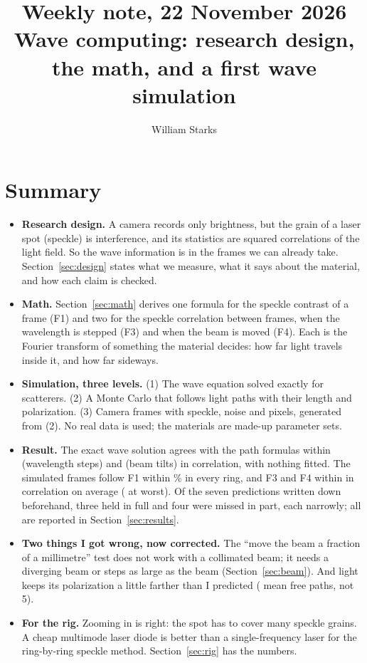 \documentclass[11pt]{article}
\title{Weekly note, 22 November 2026\\[2pt]\large Wave computing: research design, the math, and a first wave simulation}
\author{William Starks}
\date{}
\begin{document}
\maketitle

\section*{Summary}
\begin{itemize}
\item \textbf{Research design.} A camera records only brightness, but the grain of a laser spot (speckle) is
  interference, and its statistics are squared correlations of the light field. So the wave information is in the
  frames we can already take. Section~\ref{sec:design} states what we measure, what it says about the material, and how
  each claim is checked.
\item \textbf{Math.} Section~\ref{sec:math} derives one formula for the speckle contrast of a frame (F1) and two for the
  speckle correlation between frames, when the wavelength is stepped (F3) and when the beam is moved (F4). Each is the
  Fourier transform of something the material decides: how far light travels inside it, and how far sideways.
\item \textbf{Simulation, three levels.} (1) The wave equation solved exactly for \fwN{} scatterers. (2) A Monte Carlo
  that follows light paths with their length and polarization. (3) Camera frames with speckle, noise and pixels,
  generated from (2). No real data is used; the materials are made-up parameter sets.
\item \textbf{Result.} The exact wave solution agrees with the path formulas within \fwSpecDiff{} (wavelength steps) and
  \fwTiltDiff{} (beam tilts) in correlation, with nothing fitted. The simulated frames follow F1 within
  \mWorstMulti\% in every ring, and F3 and F4 within \wlRms{} in correlation on average (\beamWorst{} at worst).
  Of the seven predictions written down beforehand, three held in full and four were missed in part, each narrowly;
  all are reported in Section~\ref{sec:results}.
\item \textbf{Two things I got wrong, now corrected.} The ``move the beam a fraction of a millimetre'' test does not
  work with a collimated beam; it needs a diverging beam or steps as large as the beam (Section~\ref{sec:beam}). And
  light keeps its polarization a little farther than I predicted (\polDist{} mean free paths, not 5).
\item \textbf{For the rig.} Zooming in is right: the spot has to cover many speckle grains. A cheap multimode laser
  diode is better than a single-frequency laser for the ring-by-ring speckle method. Section~\ref{sec:rig} has the
  numbers.
\end{itemize}
\end{document}
